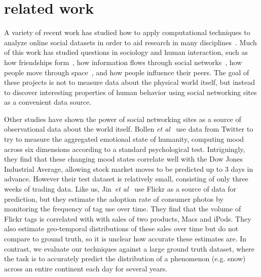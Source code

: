 \documentclass[10pt,journal,compsoc]{IEEEtran}
\begin{document}

\section{related work}
\label{sec:relatedwork}


A variety of recent work has studied how to apply computational
techniques to analyze online social datasets in order to aid research
in many disciplines~\cite{lazer09}. Much of this work has studied
questions in sociology and human interaction, such as how friendships
form~\cite{feedback08kdd}, how information flows through social
networks~\cite{libennowell08}, how people move through
space~\cite{brockmann06}, and how people influence their
peers\cite{anagnostpopoulos08}.  The goal of these projects is not to
measure data about the physical world itself, but instead to discover
interesting properties of human behavior using social networking sites
as a convenient data source.

Other studies have shown the power of social networking sites as a
source of observational data about the world itself.  Bollen
\textit{et al}~\cite{bollen11twitter} use data from Twitter to try to measure
the aggregated emotional state of humanity, computing mood across six
dimensions according to a standard psychological
test. Intriguingly, they find that these changing mood states
correlate well with the Dow Jones Industrial Average, allowing stock
market moves to be predicted up to 3 days in advance.  However their
test dataset is relatively small, consisting of only three weeks of
trading data.  Like us, Jin~\textit{et al}~\cite{jin10prediction} use
Flickr as a source of data for prediction, but they estimate the
adoption rate of consumer photos by monitoring the frequency of tag
use over time. They find that the volume of Flickr tags is 
correlated  with with sales of two products, Macs and iPods. They also
estimate geo-temporal distributions of these sales over time but do
not compare to ground truth, so it is unclear how accurate these
estimates are. In contrast, we evaluate our techniques against a large
ground truth dataset, where the task is to accurately predict the
distribution of a phenomenon (e.g. snow) across an entire continent 
each day for several years.
\end{document}
